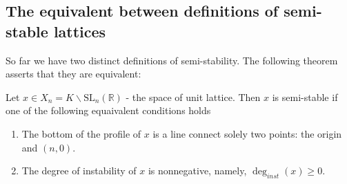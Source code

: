\subsection{The equivalent between definitions of semi-stable lattices}
So far we have two distinct definitions of semi-stability. The following theorem asserts that they are equivalent:
\begin{prop}
    Let $x \in X_n = K \backslash \text{SL}_n(\mathbb{R})$ - the space of unit lattice. Then $x$ is semi-stable if one of the following equaivalent
    conditions holds
    \begin{enumerate}
        \item The bottom of the profile of $x$ is a line connect solely two points: the origin and $(n,0)$.
        \item The degree of instability of $x$ is nonnegative, namely, $\deg_{inst}(x) \ge 0$.
    \end{enumerate}
\end{prop}
